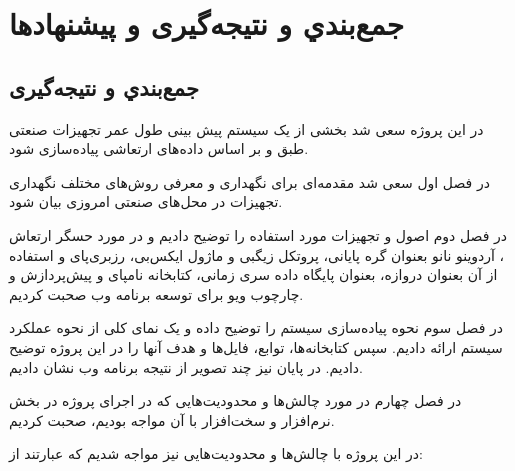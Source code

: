 \chapter{جمع‌بندي و نتيجه‌گيری و پیشنهادها}
\section{جمع‌بندي و نتيجه‌گيری}

در این پروژه سعی شد بخشی از یک سیستم پیش بینی طول عمر تجهیزات صنعتی طبق \cite{jung2017vibration} و بر اساس داده‌های ارتعاشی پیاده‌سازی شود.

در فصل اول سعی شد مقدمه‌ای برای نگهداری و معرفی روش‌های مختلف نگهداری تجهیزات در محل‌‌های صنعتی امروزی بیان شود.

در فصل دوم اصول و تجهیزات مورد استفاده را توضیح دادیم و در مورد حسگر ارتعاش ، آردوینو نانو بعنوان گره پایانی، پروتکل زیگبی و ماژول ایکس‌بی، رزبری‌پای و استفاده از آن بعنوان دروازه،  بعنوان پایگاه داده سری زمانی، کتابخانه نامپای و پیش‌پردازش و چارچوب ویو برای توسعه برنامه وب صحبت کردیم.

در فصل سوم نحوه پیاده‌سازی سیستم را توضیح داده و یک نمای کلی از نحوه عملکرد سیستم ارائه دادیم. سپس کتابخانه‌ها، توابع، فایل‌ها و هدف آنها را در این پروژه توضیح دادیم. در پایان نیز چند تصویر از نتیجه برنامه وب نشان دادیم.

در فصل چهارم در مورد چالش‌ها و محدودیت‌هایی که در اجرای پروژه در بخش نرم‌افزار و سخت‌افزار با آن مواجه بودیم، صحبت کردیم.

در این پروژه با چالش‌ها و محدودیت‌هایی نیز مواجه شدیم که عبارتند از:

